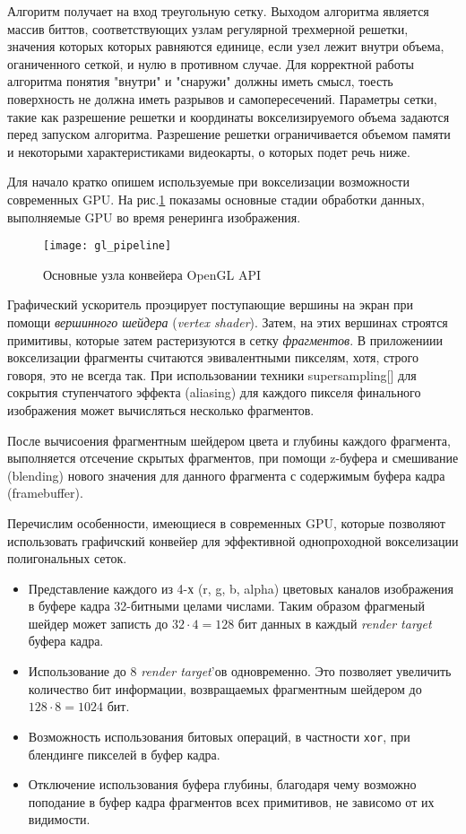 Алгоритм получает на вход треугольную сетку. Выходом алгоритма является массив биттов, соответствующих узлам регулярной трехмерной решетки, значения которых которых равняются единице, если узел лежит внутри объема, оганиченного сеткой, и нулю в противном случае. Для корректной работы алгоритма понятия "внутри" и "снаружи" должны иметь смысл, тоесть поверхность не должна иметь разрывов и самопересечений. Параметры сетки, такие как разрешение решетки и координаты вокселизируемого объема задаются перед запуском алгоритма. Разрешение решетки ограничивается объемом памяти и некоторыми характеристиками видеокарты, о которых подет речь ниже.

Для начало кратко опишем используемые при вокселизации возможности современных GPU. На рис.\ref{fig:gl_pipeline} показамы основные стадии обработки данных, выполняемые GPU во время ренеринга изображения.

\begin{figure}[ht]
\center
\texttt{[image: gl\_pipeline]}
\caption{Основные узла конвейера OpenGL API}
\label{fig:gl_pipeline}
\end{figure}

Графический ускоритель проэцирует поступающие вершины на экран при помощи \emph{вершинного шейдера} (\emph{vertex shader}). Затем, на этих вершинах строятся примитивы, которые затем растеризуются в сетку \emph{фрагментов}. В приложениии вокселизации фрагменты считаются эвивалентными пикселям, хотя, строго говоря, это не всегда так. При использовании техники supersampling[] для сокрытия ступенчатого эффекта (aliasing) для каждого пикселя финального изображения может вычисляться несколько фрагментов.

После вычисоения фрагментным шейдером цвета и глубины каждого фрагмента, выполняется отсечение скрытых фрагментов, при помощи z-буфера и смешивание (blending) нового значения для данного фрагмента с содержимым буфера кадра (framebuffer).

Перечислим особенности, имеющиеся в современных GPU, которые позволяют использовать графичский конвейер для эффективной однопроходной вокселизации полигональных сеток.

\begin{itemize}
\item Представление каждого из 4-х (r, g, b, alpha) цветовых каналов изображения в буфере кадра 32-битными целами числами. Таким образом фрагменый шейдер может записть до $32 \cdot 4 = 128$ бит данных в каждый \emph{render target} буфера кадра.
\item Использование до 8 \emph{render target}'ов одновременно. Это позволяет увеличить количество бит информации, возвращаемых фрагментным шейдером до $128 \cdot 8 = 1024$ бит.
\item Возможность использования битовых операций, в частности \texttt{xor}, при блендинге пикселей в буфер кадра.
\item Отключение использования буфера глубины, благодаря чему возможно поподание в буфер кадра фрагментов всех примитивов, не зависомо от их видимости.
\end{itemize}

